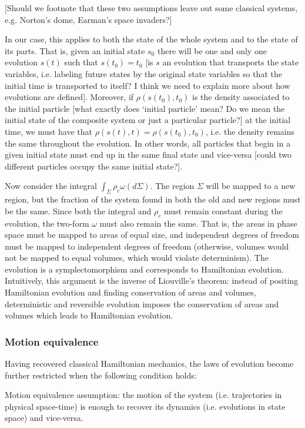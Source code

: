 \documentclass[letterpaper]{article}
\begin{document}
[Should we footnote that these two assumptions leave out some classical systems, e.g. Norton's dome, Earman's space invaders?]

In our case, this applies to both the state of the whole system and to the state of its parts. That is, given an initial state $s_0$ there will be one and only one evolution $s(t)$ such that $s(t_0) = t_0$ [is $s$ an evolution that transports the state variables, i.e. labeling future states by the original state variables so that the initial time is transported to itself? I think we need to explain more about how evolutions are defined]. Moreover, if $\rho(s(t_0), t_0)$ is the density associated to the initial particle [what exactly does `initial particle' mean? Do we mean the initial state of the composite system or just a particular particle?] at the initial time, we must have that $\rho(s(t), t) = \rho(s(t_0), t_0)$, i.e. the density remains the same throughout the evolution. In other words, all particles that begin in a given initial state must end up in the same final state and vice-versa [could two different particles occupy the same initial state?].

Now consider the integral $\int_{\Sigma} \rho_c \omega(d\Sigma)$. The region $\Sigma$ will be mapped to a new region, but the fraction of the system found in both the old and new regions must be the same. Since both the integral and $\rho_c$ must remain constant during the evolution, the two-form $\omega$ must also remain the same. That is, the areas in phase space must be mapped to areas of equal size, and independent degrees of freedom must be mapped to independent degrees of freedom (otherwise, volumes would not be mapped to equal volumes, which would violate determinism). The evolution is a symplectomorphism and corresponds to Hamiltonian evolution. Intuitively, this argument is the inverse of Liouville's theorem: instead of positing Hamiltonian evolution and finding conservation of areas and volumes, deterministic and reversible evolution imposes the conservation of areas and volumes which leads to Hamiltonian evolution.


\subsubsection{Motion equivalence}

Having recovered classical Hamiltonian mechanics, the laws of evolution become further restricted when the following condition holds:

Motion equivalence assumption: the motion of the system (i.e. trajectories in physical space-time) is enough to recover its dynamics (i.e. evolutions in state space) and vice-versa.
\end{document}
